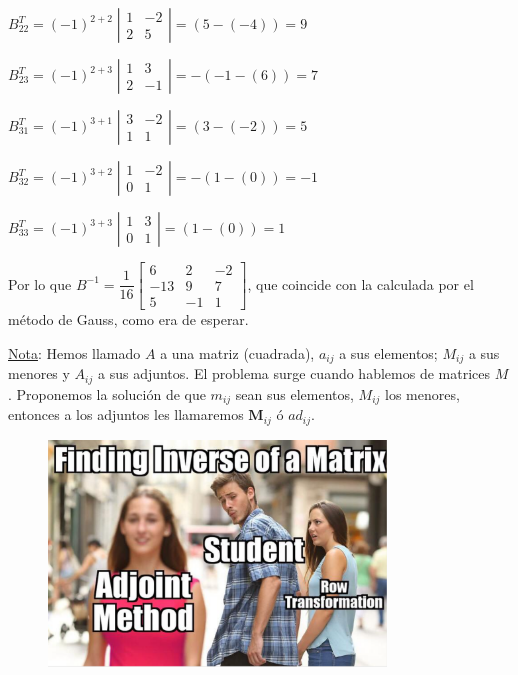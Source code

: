 \begin{ejem}
$B^T_{22}= (-1)^{2+2}\; \left| \begin{matrix} 1&-2\\2&5 \end{matrix} \right|=
(5-(-4))=9$

$B^T_{23}= (-1)^{2+3}\; \left| \begin{matrix} 1&3\\2&-1 \end{matrix} \right|=
-(-1-(6))=7$


$B^T_{31}= (-1)^{3+1}\; \left| \begin{matrix} 3&-2\\1&1 \end{matrix} \right|=
(3-(-2))=5$

$B^T_{32}= (-1)^{3+2}\; \left| \begin{matrix} 1&-2\\0&1 \end{matrix} \right|=
-(1-(0))=-1$

$B^T_{33}= (-1)^{3+3}\; \left| \begin{matrix} 1&3\\0&1 \end{matrix} \right|=
(1-(0))=1$

Por lo que $B^{-1}=
\dfrac 1 {16} \left[ \begin{matrix} 6&2&-2 \\ -13&9&7 \\5&-1&1  \end{matrix} \right]$, que coincide con la calculada por el método de Gauss, como era de esperar.

\end{ejem}

\underline{Nota}: Hemos llamado $A$ a una matriz (cuadrada), $a_{ij}$ a sus elementos; $M_{ij}$ a sus menores y $A_{ij}$ a sus adjuntos. El problema surge cuando hablemos de matrices $M$. Proponemos la solución de que $m_{ij}$ sean sus elementos, $M_{ij}$ los menores, entonces a los adjuntos les llamaremos $\boldsymbol{M}_{ij}$ ó $ad_{ij}$.

\begin{figure}[]
	\centering
	\includegraphics[width=0.8\textwidth]{imagenes/imagenes04/T04IM02.png}
\end{figure}

